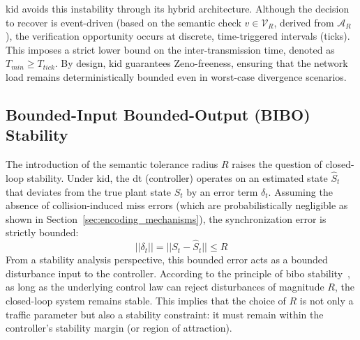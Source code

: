 \gls{kid} avoids this instability through its hybrid architecture. Although the decision to recover is event-driven (based on the semantic check $v \in \mathcal{V}_R$, derived from $\mathcal{A}_R$), the verification opportunity occurs at discrete, time-triggered intervals (ticks). This imposes a strict lower bound on the inter-transmission time, denoted as $T_{min} \ge T_{tick}$. By design, \gls{kid} guarantees Zeno-freeness, ensuring that the network load remains deterministically bounded even in worst-case divergence scenarios.

\subsection{Bounded-Input Bounded-Output (BIBO) Stability}
The introduction of the semantic tolerance radius $R$ raises the question of closed-loop stability. Under \gls{kid}, the \gls{dt} (controller) operates on an estimated state $\hat{S}_t$ that deviates from the true plant state $S_t$ by an error term $\delta_t$. Assuming the absence of collision-induced miss errors (which are probabilistically negligible as shown in Section~\ref{sec:encoding_mechanisms}), the synchronization error is strictly bounded:
\begin{equation}
    ||\delta_t|| = ||S_t - \hat{S}_t|| \le R
\end{equation}
From a stability analysis perspective, this bounded error acts as a bounded disturbance input to the controller. According to the principle of \gls{bibo} stability~\cite{hespanha2007survey}, as long as the underlying control law can reject disturbances of magnitude $R$, the closed-loop system remains stable. This implies that the choice of $R$ is not only a traffic parameter but also a stability constraint: it must remain within the controller's stability margin (or region of attraction).
